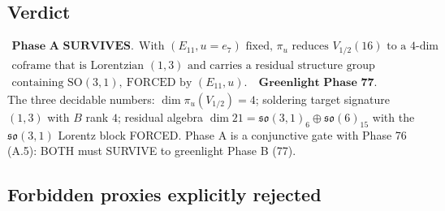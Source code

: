 \subsection{Verdict}

\begin{equation}
  \boxed{
    \begin{array}{l}
    \textbf{Phase A SURVIVES.}\ \ \text{With } (E_{11},u=e_7) \text{ fixed, } \pi_u
    \text{ reduces } V_{1/2}(16) \text{ to a } 4\text{-dim} \\[2pt]
    \text{coframe that is Lorentzian } (1,3) \text{ and carries a residual structure
    group} \\[2pt]
    \text{containing } \mathrm{SO}(3,1),\ \text{FORCED by } (E_{11},u). \quad
    \textbf{Greenlight Phase 77.}
    \end{array}
  }
\end{equation}
The three decidable numbers: $\dim\pi_u(V_{1/2})=4$; soldering target signature
$(1,3)$ with $B$ rank $4$; residual algebra $\dim 21 = \mathfrak{so}(3,1)_6\oplus
\mathfrak{so}(6)_{15}$ with the $\mathfrak{so}(3,1)$ Lorentz block FORCED. Phase A is a
conjunctive gate with Phase 76 (A.5): BOTH must SURVIVE to greenlight Phase B (77).

\subsection{Forbidden proxies explicitly rejected}

